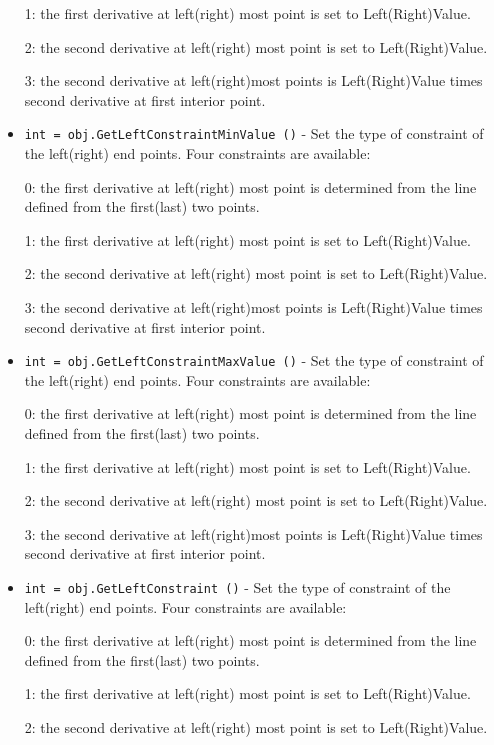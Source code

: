 \begin{itemize}
 1: the first derivative at left(right) most point is set to
 Left(Right)Value.
 
 2: the second derivative at left(right) most point is set to
 Left(Right)Value.
 
 3: the second derivative at left(right)most points is Left(Right)Value
 times second derivative at first interior point.

\item  \verb|int = obj.GetLeftConstraintMinValue ()| -  Set the type of constraint of the left(right) end points. Four
 constraints are available:
 
 0: the first derivative at left(right) most point is determined
 from the line defined from the first(last) two points.

 1: the first derivative at left(right) most point is set to
 Left(Right)Value.
 
 2: the second derivative at left(right) most point is set to
 Left(Right)Value.
 
 3: the second derivative at left(right)most points is Left(Right)Value
 times second derivative at first interior point.

\item  \verb|int = obj.GetLeftConstraintMaxValue ()| -  Set the type of constraint of the left(right) end points. Four
 constraints are available:
 
 0: the first derivative at left(right) most point is determined
 from the line defined from the first(last) two points.

 1: the first derivative at left(right) most point is set to
 Left(Right)Value.
 
 2: the second derivative at left(right) most point is set to
 Left(Right)Value.
 
 3: the second derivative at left(right)most points is Left(Right)Value
 times second derivative at first interior point.

\item  \verb|int = obj.GetLeftConstraint ()| -  Set the type of constraint of the left(right) end points. Four
 constraints are available:
 
 0: the first derivative at left(right) most point is determined
 from the line defined from the first(last) two points.

 1: the first derivative at left(right) most point is set to
 Left(Right)Value.
 
 2: the second derivative at left(right) most point is set to
 Left(Right)Value.
 

\end{itemize}
